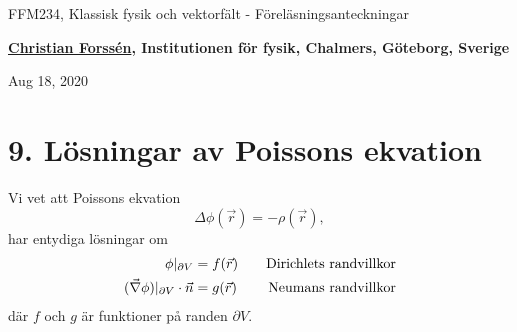 \documentclass[%
oneside,                 %
final,                   %
10pt]{article}
\begin{document}

\newcommand{\exercisesection}[1]{\subsection*{#1}}







\thispagestyle{empty}

\begin{center}
{\LARGE\bf
\begin{spacing}{1.25}
FFM234, Klassisk fysik och vektorfält - Föreläsningsanteckningar
\end{spacing}
}
\end{center}


\begin{center}
{\bf \href{{http://fy.chalmers.se/subatom/tsp/}}{Christian Forssén}, Institutionen för fysik, Chalmers, Göteborg, Sverige${}^{}$} \\ [0mm]
\end{center}

\begin{center}
\end{center}
    

\begin{center}
Aug 18, 2020
\end{center}

\vspace{1cm}


\section*{9. Lösningar av Poissons ekvation}
Vi vet att Poissons ekvation
$$
\Delta \phi(\vec{r}) = - \rho(\vec{r}),
$$
har entydiga lösningar om
\begin{align}
\phi|_{\partial V} &= f(\vec{r}) \quad & \mathrm{Dirichlets~randvillkor} \nonumber \\
(\vec{\nabla}\phi)|_{\partial V} \cdot \vec{n} &= g(\vec{r}) \quad & \mathrm{Neumans~randvillkor} \nonumber 
\end{align}
där $f$ och $g$ är funktioner på randen $\partial V$.
\end{document}
